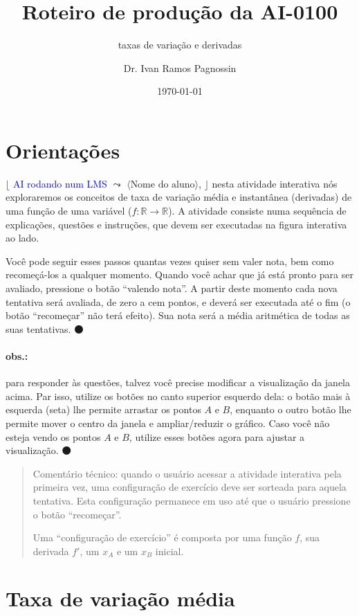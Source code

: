 \documentclass[fleqn,12pt]{scrartcl}
\title{Roteiro de produção da AI-0100}
\subtitle{taxas de variação e derivadas}
\author{Dr. Ivan Ramos Pagnossin}
\date{\today}
\newenvironment{ct}{\begin{quotation}\color{red!30!black}\sffamily\small Comentário técnico:}{\end{quotation}} %
\newcommand\proceed{\textcolor{green!50!black}{$\medbullet$}\xspace}
\newcommand\condicional[2]{$\lfloor$%
	\textsf{\textcolor{blue}{{\footnotesize #1}}}
	$\leadsto$ #2%
	$\rfloor$}
\begin{document}
    \maketitle
    
    \section{Orientações}

    \condicional{AI rodando num LMS}{$\langle\text{Nome do aluno}\rangle$,} nesta atividade interativa nós exploraremos os conceitos de taxa de variação média e instantânea (derivadas) de uma função de uma variável ($f: \mathbb{R} \to \mathbb{R}$). A atividade consiste numa sequência de explicações, questões e instruções, que devem ser executadas na figura interativa ao lado.

    Você pode seguir esses passos quantas vezes quiser sem valer nota, bem como recomeçá-los a qualquer momento. Quando você achar que já está pronto para ser avaliado, pressione o botão ``valendo nota''. A partir deste momento cada nova tentativa será avaliada, de zero a cem pontos, e deverá ser executada até o fim (o botão ``recomeçar'' não terá efeito). Sua nota será a média aritmética de todas as suas tentativas. \proceed

    \paragraph{obs.:} para responder às questões, talvez você precise modificar a visualização da janela acima. Par isso, utilize os botões no canto superior esquerdo dela: o botão mais à esquerda (seta) lhe permite arrastar os pontos $A$ e $B$, enquanto o outro botão lhe permite mover o centro da janela e ampliar/reduzir o gráfico. Caso você não esteja vendo os pontos $A$ e $B$, utilize esses botões agora para ajustar a visualização. \proceed

    \begin{ct}
	quando o usuário acessar a atividade interativa pela primeira vez, uma configuração de exercício deve ser sorteada para aquela tentativa. Esta configuração permanece em uso até que o usuário pressione o botão ``recomeçar''.

	Uma ``configuração de exercício'' é composta por uma função $f$, sua derivada $f'$, um $x_A$ e um $x_B$ inicial. 
    \end{ct}

    \section{Taxa de variação média}
\end{document}
